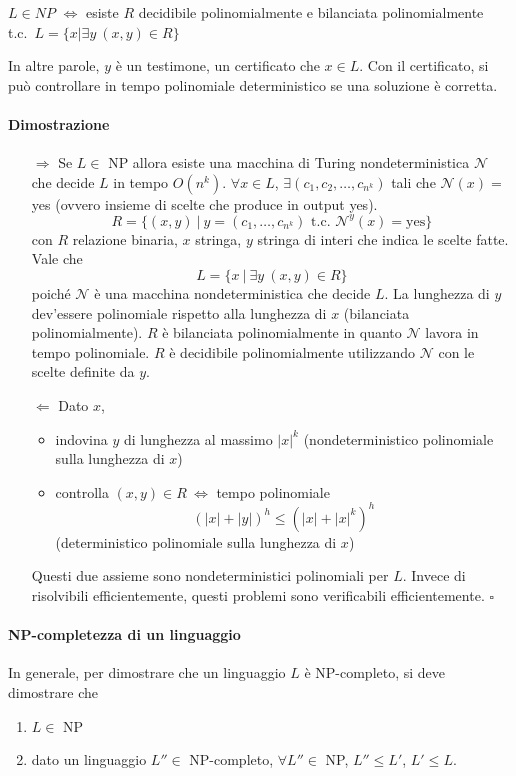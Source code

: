 \begin{theorem}
    $L\in NP$ $\Leftrightarrow$ esiste $R$ decidibile polinomialmente e bilanciata polinomialmente t.c.~$L=\{x|\exists y~(x,y)\in R\}$
\end{theorem}
In altre parole, $y$ è un testimone, un certificato che $x\in L$. Con il certificato, si può controllare in tempo polinomiale deterministico se una soluzione è corretta.


\paragraph{Dimostrazione} 
\begin{itemize}
    \item[$\Rightarrow$] Se $L\in$ NP allora esiste una macchina di Turing nondeterministica $\mathcal{N}$ che decide $L$ in tempo $O(n^k)$. $\forall x\in L$, $\exists(c_1,c_2,\dots,c_{n^k})$ tali che $\mathcal{N}(x)=$ yes (ovvero insieme di scelte che produce in out\-put yes).
    $$
        R = \{ (x,y) ~|~ y=(c_1,\dots,c_{n^k}) \text{ t.c.~} \mathcal{N}^y(x)=\text{yes} \}
    $$
    con $R$ relazione binaria, $x$ stringa, $y$ stringa di interi che indica le scelte fatte. Vale che 
    $$
        L = \{ x ~|~ \exists y~(x,y)\in R \}
    $$
    poiché $\mathcal{N}$ è una macchina nondeterministica che decide $L$. La lunghezza di $y$ dev'essere polinomiale rispetto alla lunghezza di $x$ (bilanciata polinomialmente). $R$ è bilanciata polinomialmente in quanto $\mathcal{N}$ lavora in tempo polinomiale. $R$ è decidibile polinomialmente utilizzando $\mathcal{N}$ con le scelte definite da $y$.
    \item[$\Leftarrow$] Dato $x$,
    \begin{itemize}
        \item indovina $y$ di lunghezza al massimo $|x|^k$ (nondeterministico polinomiale sulla lunghezza di $x$)
        \item controlla $(x,y)\in R ~\Leftrightarrow$ tempo polinomiale 
        $$
            (|x|+|y|)^h \leq (|x| + |x|^k)^h
        $$
        (deterministico polinomiale sulla lunghezza di $x$)
    \end{itemize}
    Questi due assieme sono nondeterministici polinomiali per $L$. Invece di risolvibili efficientemente, questi problemi sono verificabili efficientemente. \hfill$\square$ 
\end{itemize}

\paragraph{NP-completezza di un linguaggio} In generale, per dimostrare che un linguaggio $L$ è NP-completo, si deve dimostrare che 
\begin{enumerate}
    \item $L\in$ NP
    \item dato un linguaggio $L''\in$ NP-completo, $\forall L''\in$ NP, $L''\leq L'$, $L'\leq L$. 
\end{enumerate}


